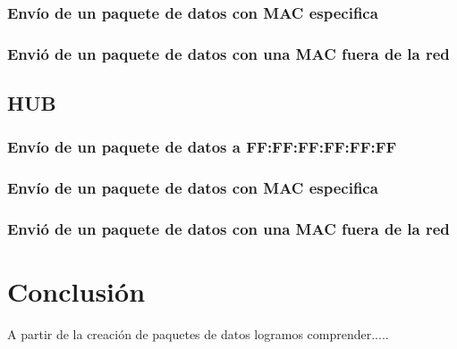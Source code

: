 \documentclass[spanish]{udpreport}
\begin{document}
\subsection{Envío de un paquete de datos con MAC especifica}

\subsection{Envió de un paquete de datos con una MAC fuera de la red}

\section{HUB}

\subsection{Envío de un paquete de datos a FF:FF:FF:FF:FF:FF}

\subsection{Envío de un paquete de datos con MAC especifica}

\subsection{Envió de un paquete de datos con una MAC fuera de la red}


\chapter{Conclusión}

A partir de la creación de paquetes de datos logramos comprender.....
\end{document}
